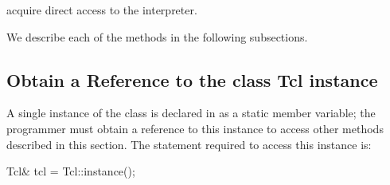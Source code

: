 \begin{list}{\textbullet}{}
\item acquire direct access to the interpreter.
\end{list}
We describe each of the methods in the following subsections.

\subsection{Obtain a Reference to the class Tcl instance}
\label{sec:instance}

A single instance of the class is declared in 
as a static member variable;
the programmer must obtain a reference to this instance
to access other methods described in this section.
The statement required to access this instance is:
\begin{program}
        Tcl& tcl = Tcl::instance();
\end{program}

